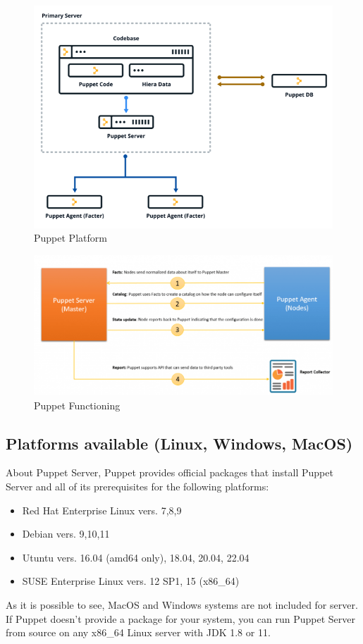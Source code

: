 \documentclass[12pt,a4paper,openright,twoside]{book}
\begin{document}
\begin{figure}[H]
    \centering
    \includegraphics[width=.8\linewidth]{figures/puppetplatformjpeg.png}
    \caption{Puppet Platform}
    \label{fig:puppet-platform-image}
\end{figure}\cite{puppetDocPlatform}

\begin{figure}[H]
    \centering
    \includegraphics[width=.8\linewidth]{figures/puppetfunctioning.png}
    \caption{Puppet Functioning}
    \label{fig:puppet-functioning-image}
\end{figure}\cite{puppetImgFunctioning}

\subsection{Platforms available (Linux, Windows, MacOS)}

About Puppet Server, Puppet provides official packages that install Puppet Server and all of its prerequisites for the following platforms:

\begin{itemize}
    \item Red Hat Enterprise Linux vers. 7,8,9
    \item Debian vers. 9,10,11
    \item Utuntu vers. 16.04 (amd64 only), 18.04, 20.04, 22.04
    \item SUSE Enterprise Linux vers. 12 SP1, 15 (x86\_64)
\end{itemize}
As it is possible to see, MacOS and Windows systems are not included for server.
If Puppet doesn't provide a package for your system, you can run Puppet Server from source on any x86\_64 Linux server with JDK 1.8 or 11.
\cite{puppetDocSupportServer}
\end{document}
